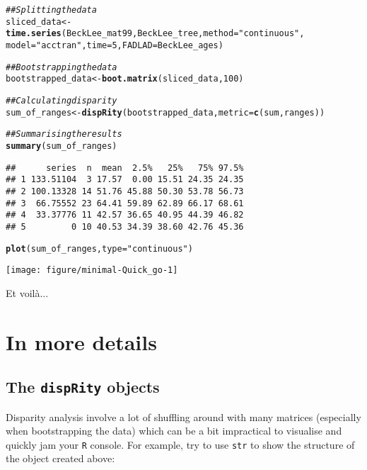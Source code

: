 \documentclass{article}\usepackage[]{graphicx}\usepackage[]{color}
\makeatletter
\newcommand{\hlnum}[1]{\textcolor[rgb]{0.686,0.059,0.569}{#1}}%
\newcommand{\hlstr}[1]{\textcolor[rgb]{0.192,0.494,0.8}{#1}}%
\newcommand{\hlcom}[1]{\textcolor[rgb]{0.678,0.584,0.686}{\textit{#1}}}%
\newcommand{\hlstd}[1]{\textcolor[rgb]{0.345,0.345,0.345}{#1}}%
\newcommand{\hlkwb}[1]{\textcolor[rgb]{0.69,0.353,0.396}{#1}}%
\newcommand{\hlkwc}[1]{\textcolor[rgb]{0.333,0.667,0.333}{#1}}%
\newcommand{\hlkwd}[1]{\textcolor[rgb]{0.737,0.353,0.396}{\textbf{#1}}}%
\newenvironment{kframe}{%
 \def\at@end@of@kframe{}%
 \ifinner\ifhmode%
  \def\at@end@of@kframe{\end{minipage}}%
  \begin{minipage}{\columnwidth}%
 \fi\fi%
 \def\FrameCommand##1{\hskip\@totalleftmargin \hskip-\fboxsep
 \colorbox{shadecolor}{##1}\hskip-\fboxsep
     \hskip-\linewidth \hskip-\@totalleftmargin \hskip\columnwidth}%
 \MakeFramed {\advance\hsize-\width
   \@totalleftmargin\z@ \linewidth\hsize
   \@setminipage}}%
 {\par\unskip\endMakeFramed%
 \at@end@of@kframe}
\newenvironment{knitrout}{}{} %
\newcommand{\dispRity}{\texttt{dispRity} }
\newcommand{\R}{\texttt{R} }
\makeatother
\begin{document}
\begin{knitrout}
\color{fgcolor}\begin{kframe}
\begin{alltt}
\hlcom{## Splitting the data}
\hlstd{sliced_data} \hlkwb{<-} \hlkwd{time.series}\hlstd{(BeckLee_mat99, BeckLee_tree,} \hlkwc{method} \hlstd{=} \hlstr{"continuous"}\hlstd{,}
    \hlkwc{model} \hlstd{=} \hlstr{"acctran"}\hlstd{,} \hlkwc{time} \hlstd{=} \hlnum{5}\hlstd{,} \hlkwc{FADLAD} \hlstd{= BeckLee_ages)}
\end{alltt}


{\ttfamily\noindent\itshape\color{messagecolor}{\#\# Some tips have FAD/LAD and are assumed to interval single points in time.}}\begin{alltt}
\hlcom{## Bootstrapping the data}
\hlstd{bootstrapped_data} \hlkwb{<-} \hlkwd{boot.matrix}\hlstd{(sliced_data,} \hlnum{100}\hlstd{)}

\hlcom{## Calculating disparity}
\hlstd{sum_of_ranges} \hlkwb{<-} \hlkwd{dispRity}\hlstd{(bootstrapped_data,} \hlkwc{metric} \hlstd{=} \hlkwd{c}\hlstd{(sum, ranges))}

\hlcom{## Summarising the results}
\hlkwd{summary}\hlstd{(sum_of_ranges)}
\end{alltt}
\begin{verbatim}
##      series  n  mean  2.5%   25%   75% 97.5%
## 1 133.51104  3 17.57  0.00 15.51 24.35 24.35
## 2 100.13328 14 51.76 45.88 50.30 53.78 56.73
## 3  66.75552 23 64.41 59.89 62.89 66.17 68.61
## 4  33.37776 11 42.57 36.65 40.95 44.39 46.82
## 5         0 10 40.53 34.39 38.60 42.76 45.36
\end{verbatim}
\begin{alltt}
\hlkwd{plot}\hlstd{(sum_of_ranges,} \hlkwc{type} \hlstd{=} \hlstr{"continuous"}\hlstd{)}
\end{alltt}
\end{kframe}

{\centering \texttt{[image: figure/minimal-Quick\_go-1]} 

}



\end{knitrout}

Et voil\`{a}...

\section{In more details}

\subsection{The \dispRity objects}
Disparity analysis involve a lot of shuffling around with many matrices (especially when bootstrapping the data) which can be a bit impractical to visualise and quickly jam your \R console.
For example, try to use \texttt{str} to show the structure of the object created above:
\end{document}
